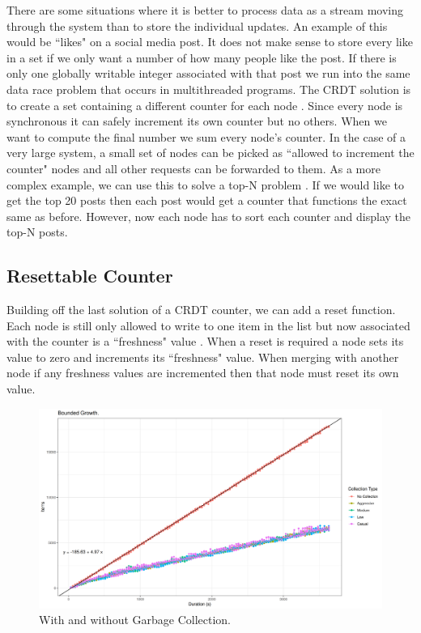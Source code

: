 \documentclass{article}
\begin{document}
\begin{multicols}{2}
\begin{refsection}
There are some situations where it is better to process data as a stream
moving through the system than to store the individual updates. An
example of this would be ``likes" on a social media post. It does not
make sense to store every like in a set if we only want a number of how
many people like the post. If there is only one globally writable
integer associated with that post we run into the same data race problem
that occurs in multithreaded programs. The CRDT solution is to create a
set containing a different counter for each node \cite{navalho_incremental_2013}.
Since every node is synchronous it can safely increment its own counter
but no others. When we want to compute the final number we sum every
node's counter. In the case of a very large system, a small set of nodes
can be picked as ``allowed to increment the counter" nodes and all other
requests can be forwarded to them. As a more complex example, we can use
this to solve a top-N problem \cite{navalho_incremental_2013}. If we
would like to get the top 20 posts then each post would get a counter
that functions the exact same as before. However, now each node has to
sort each counter and display the top-N posts.

\subsection*{Resettable Counter}

Building off the last solution of a CRDT counter, we can add a reset
function. Each node is still only allowed to write to one item in the
list but now associated with the counter is a ``freshness" value
\cite{baquero_problem_2016}. When a reset is required a node sets its
value to zero and increments its ``freshness" value. When merging with
another node if any freshness values are incremented then that node
must reset its own value. 

\begin{figure}[t]
\includegraphics[width=\textwidth]{BoundedGrowth1_2}
\centering
\caption{With and without Garbage Collection.}
\label{fig:figureA}
\end{figure}


\end{refsection}
\end{multicols}
\end{document}
